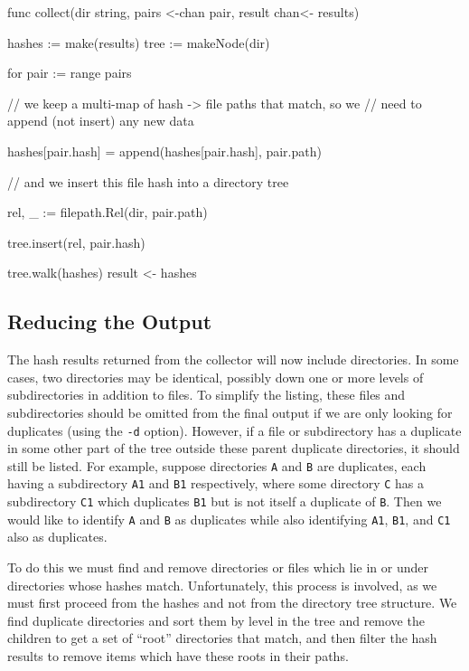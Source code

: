 \documentclass[12pt,notitlepage]{article}
\begin{document}
\begin{golang}
func collect(dir string, pairs <-chan pair, result chan<- results) {
	hashes := make(results)
	tree := makeNode(dir)

	for pair := range pairs {
		// we keep a multi-map of hash -> file paths that match, so we
		// need to append (not insert) any new data

		hashes[pair.hash] = append(hashes[pair.hash], pair.path)

		// and we insert this file hash into a directory tree

		rel, _ := filepath.Rel(dir, pair.path)

		tree.insert(rel, pair.hash)
	}

	tree.walk(hashes)
	result <- hashes
}
\end{golang}

\subsection{Reducing the Output}
The hash results returned from the collector will now include directories. In
some cases, two directories may be identical, possibly down one or more levels
of subdirectories in addition to files. To simplify the listing, these files
and subdirectories should be omitted from the final output if we are only
looking for duplicates (using the \verb|-d| option). However, if a file or
subdirectory has a duplicate in some other part of the tree outside these
parent duplicate directories, it should still be listed. For example, suppose
directories \verb|A| and \verb|B| are duplicates, each having a subdirectory
\verb|A1| and \verb|B1| respectively, where some directory \verb|C| has a
subdirectory \verb|C1| which duplicates \verb|B1| but is not itself a duplicate
of \verb|B|. Then we would like to identify \verb|A| and \verb|B| as duplicates
while also identifying \verb|A1|, \verb|B1|, and \verb|C1| also as duplicates.

To do this we must find and remove directories or files which lie in or under
directories whose hashes match. Unfortunately, this process is involved, as
we must first proceed from the hashes and not from the directory tree structure.
We find duplicate directories and sort them by level in the tree and remove the
children to get a set of ``root'' directories that match, and then filter the
hash results to remove items which have these roots in their paths.
\end{document}
